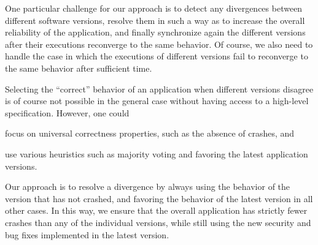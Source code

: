 One particular challenge for our approach is to detect any divergences between
different software versions, resolve them in such a way as to increase the
overall reliability of the application, and finally synchronize again the
different versions after their executions reconverge to the same behavior.  Of
course, we also need to handle the case in which the executions of different
versions fail to reconverge to the same behavior after sufficient time.

Selecting the ``correct'' behavior of an application when different versions
disagree is of course not possible in the general case without having access to
a high-level specification.  However, one could%
\begin{inparaenum}[(1)]
\item focus on universal
correctness properties, such as the absence of crashes, and
\item use various
heuristics such as majority voting and favoring the latest application
versions.
\end{inparaenum}
Our approach is to resolve a divergence by always using the behavior of the
version that has not crashed, and favoring the behavior of the latest version
in all other cases. In this way, we ensure that the overall application has
strictly fewer crashes than any of the individual versions, while still using
the new security and bug fixes implemented in the latest version.





